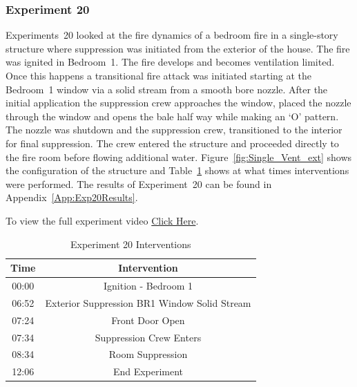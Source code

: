\documentclass[12pt,oneside]{book}
\begin{document}
\subsubsection{Experiment 20}
Experiments~20 looked at the fire dynamics of a bedroom fire in a single-story structure where suppression was initiated from the exterior of the house. The fire was ignited in Bedroom~1. The fire develops and becomes ventilation limited. Once this happens a transitional fire attack was initiated starting at the Bedroom~1 window via a solid stream from a smooth bore nozzle. After the initial application the suppression crew approaches the window, placed the nozzle through the window and opens the bale half way while making an `O' pattern. The nozzle was shutdown and the suppression crew, transitioned to the interior for final suppression. The crew entered the structure and proceeded directly to the fire room before flowing additional water. Figure~\ref{fig:Single_Vent_ext} shows the configuration of the structure and Table~\ref{Table:Exp20Interventions} shows at what times interventions were performed. The results of Experiment~20 can be found in Appendix~\ref{App:Exp20Results}. 

To view the full experiment video \href{https://player.vimeo.com/video/170499620?autoplay=1}{Click Here}.

\begin{table}[H]
	\centering
	\caption{Experiment 20 Interventions}
	\begin{tabular}{|c|c|} 
		\hline
		Time & Intervention \\ \hline \hline
		00:00 & Ignition - Bedroom 1 \\ \hline
		06:52 & Exterior Suppression BR1 Window Solid Stream \\ \hline
		07:24 & Front Door Open \\ \hline
		07:34 & Suppression Crew Enters\\ \hline
		08:34 & Room Suppression \\ \hline 
		12:06 & End Experiment\\ \hline
	\end{tabular}
	\label{Table:Exp20Interventions}
\end{table}

\FloatBarrier
\end{document}
